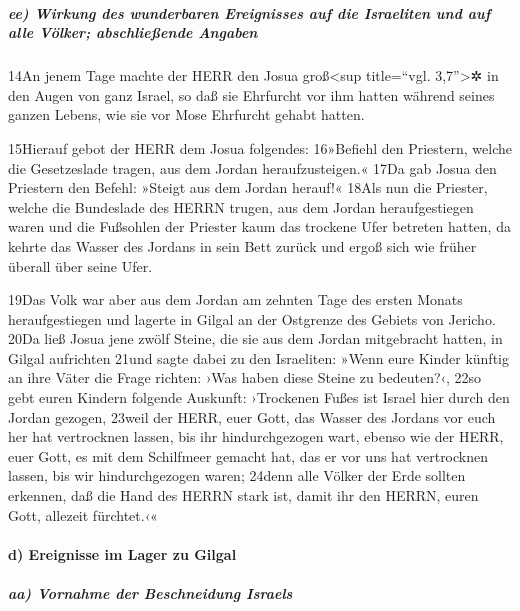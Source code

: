 \hypertarget{ee-wirkung-des-wunderbaren-ereignisses-auf-die-israeliten-und-auf-alle-vuxf6lker-abschlieuxdfende-angaben}{%
\subparagraph{ee) Wirkung des wunderbaren Ereignisses auf die Israeliten
und auf alle Völker; abschließende
Angaben}\label{ee-wirkung-des-wunderbaren-ereignisses-auf-die-israeliten-und-auf-alle-vuxf6lker-abschlieuxdfende-angaben}}

14An jenem Tage machte der HERR den Josua groß\textless sup title=``vgl.
3,7''\textgreater✲ in den Augen von ganz Israel, so daß sie Ehrfurcht
vor ihm hatten während seines ganzen Lebens, wie sie vor Mose Ehrfurcht
gehabt hatten.

15Hierauf gebot der HERR dem Josua folgendes: 16»Befiehl den Priestern,
welche die Gesetzeslade tragen, aus dem Jordan heraufzusteigen.« 17Da
gab Josua den Priestern den Befehl: »Steigt aus dem Jordan herauf!«
18Als nun die Priester, welche die Bundeslade des HERRN trugen, aus dem
Jordan heraufgestiegen waren und die Fußsohlen der Priester kaum das
trockene Ufer betreten hatten, da kehrte das Wasser des Jordans in sein
Bett zurück und ergoß sich wie früher überall über seine Ufer.

19Das Volk war aber aus dem Jordan am zehnten Tage des ersten Monats
heraufgestiegen und lagerte in Gilgal an der Ostgrenze des Gebiets von
Jericho. 20Da ließ Josua jene zwölf Steine, die sie aus dem Jordan
mitgebracht hatten, in Gilgal aufrichten 21und sagte dabei zu den
Israeliten: »Wenn eure Kinder künftig an ihre Väter die Frage richten:
›Was haben diese Steine zu bedeuten?‹, 22so gebt euren Kindern folgende
Auskunft: ›Trockenen Fußes ist Israel hier durch den Jordan gezogen,
23weil der HERR, euer Gott, das Wasser des Jordans vor euch her hat
vertrocknen lassen, bis ihr hindurchgezogen wart, ebenso wie der HERR,
euer Gott, es mit dem Schilfmeer gemacht hat, das er vor uns hat
vertrocknen lassen, bis wir hindurchgezogen waren; 24denn alle Völker
der Erde sollten erkennen, daß die Hand des HERRN stark ist, damit ihr
den HERRN, euren Gott, allezeit fürchtet.‹«

\hypertarget{d-ereignisse-im-lager-zu-gilgal}{%
\paragraph{d) Ereignisse im Lager zu
Gilgal}\label{d-ereignisse-im-lager-zu-gilgal}}

\hypertarget{aa-vornahme-der-beschneidung-israels}{%
\subparagraph{aa) Vornahme der Beschneidung
Israels}\label{aa-vornahme-der-beschneidung-israels}}

